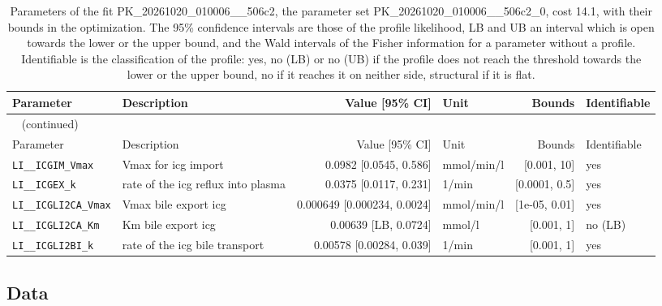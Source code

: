 \begin{longtable}{llrlrl}
\caption{Parameters of the fit PK\_20261020\_010006\_\_506c2, the parameter set PK\_20261020\_010006\_\_506c2\_0, cost 14.1, with their bounds in the optimization. The 95\% confidence intervals are those of the profile likelihood, LB and UB an interval which is open towards the lower or the upper bound, and the Wald intervals of the Fisher information for a parameter without a profile. Identifiable is the classification of the profile: yes, no (LB) or no (UB) if the profile does not reach the threshold towards the lower or the upper bound, no if it reaches it on neither side, structural if it is flat.}\label{tab:parameters:PK_20261020_010006__506c2} \\
\toprule
Parameter & Description & Value [95\% CI] & Unit & Bounds & Identifiable \\
\midrule
\endfirsthead
\multicolumn{6}{l}{\small\tablename~\thetable{} (continued)} \\
\toprule
Parameter & Description & Value [95\% CI] & Unit & Bounds & Identifiable \\
\midrule
\endhead
\bottomrule
\endlastfoot
\texttt{LI\_\_ICGIM\_Vmax} & Vmax for icg import & 0.0982 [0.0545, 0.586] & mmol/min/l & [0.001, 10] & yes \\
\texttt{LI\_\_ICGEX\_k} & rate of the icg reflux into plasma & 0.0375 [0.0117, 0.231] & 1/min & [0.0001, 0.5] & yes \\
\texttt{LI\_\_ICGLI2CA\_Vmax} & Vmax bile export icg & 0.000649 [0.000234, 0.0024] & mmol/min/l & [1e-05, 0.01] & yes \\
\texttt{LI\_\_ICGLI2CA\_Km} & Km bile export icg & 0.00639 [LB, 0.0724] & mmol/l & [0.001, 1] & no (LB) \\
\texttt{LI\_\_ICGLI2BI\_k} & rate of the icg bile transport & 0.00578 [0.00284, 0.039] & 1/min & [0.001, 1] & yes \\
\end{longtable}

\subsection{Data}

